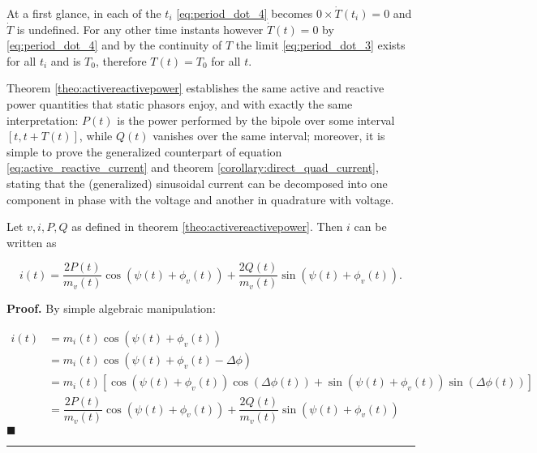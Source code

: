 	At a first glance, in each of the $t_i$ \eqref{eq:period_dot_4} becomes $0\times \dot{T}\left(t_i\right) = 0$ and $\dot{T}$ is undefined. For any other time instants however $\dot{T}\left(t\right) = 0$ by \eqref{eq:period_dot_4} and by the continuity of $T$ the limit \eqref{eq:period_dot_3} exists for all $t_i$ and is $T_0$, therefore $T(t) = T_0$ for all $t$.

	Theorem \ref{theo:activereactivepower} establishes the same active and reactive power quantities that static phasors enjoy, and with exactly the same interpretation: $P(t)$ is the power performed by the bipole over some interval $\left[t,t+T(t)\right]$, while $Q(t)$ vanishes over the same interval; moreover, it is simple to prove the generalized counterpart of equation \eqref{eq:active_reactive_current} and theorem \ref{corollary:direct_quad_current}, stating that the (generalized) sinusoidal current can be decomposed into one component in phase with the voltage and another in quadrature with voltage.

\begin{theorem}\label{theo:direct_quad_current_nonst} %
	Let $v,i,P,Q$ as defined in theorem \ref{theo:activereactivepower}. Then $i$ can be written as

\begin{equation} i(t) = \dfrac{2P(t)}{m_v(t)}\cos\left(\psi(t) + \phi_v(t)\right) + \dfrac{2Q(t)}{m_v(t)}\sin\left(\psi(t) + \phi_v(t)\right) .\end{equation}
\end{theorem}
\textbf{Proof.} By simple algebraic manipulation:

\begin{align}
	i(t)
	&= m_i(t)\cos\left(\psi(t) + \phi_v(t)\right) \nonumber\\[3mm]
	&= m_i(t)\cos\left(\psi(t) + \phi_v(t) - \Delta\phi\right) \nonumber\\[3mm]
	&= m_i(t)\left[\cos\left(\psi(t) + \phi_v(t)\right)\cos\left(\Delta\phi(t)\right) + \sin\left(\psi(t) + \phi_v(t)\right)\sin\left(\Delta\phi(t)\right) \right] \nonumber\\[3mm]
	&= \dfrac{2P(t)}{m_v(t)}\cos\left(\psi(t) + \phi_v(t)\right) + \dfrac{2Q(t)}{m_v(t)}\sin\left(\psi(t) + \phi_v(t)\right)
\end{align} \hfill$\blacksquare$

\vspace{5mm}
\hrule
\vspace{5mm} %

